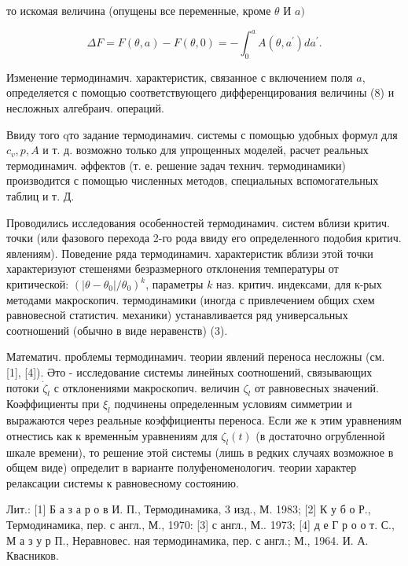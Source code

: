 \documentclass[10pt]{article}
\begin{document}
то искомая величина (опущены все переменные, кроме $\theta$ И $a)$



\[

\Delta F=F(\theta, a)-F(\theta, 0)=-\int_{0}^{a} A\left(\theta, a^{\prime}\right) d a^{\prime} .

\]



Изменение термодинамич. характеристик, связанное с включением поля $a$, определяется с помощью соответствующего дифференцирования величины (8) и несложных алгебраич. операций.



Ввиду того qто задание термодинамич. системы с помощью удобных формул для $c_{v}, p, A$ и т. д. возможно только для упрощенных моделей, расчет реальных термодинамич. әффектов (т. е. решение задач технич. термодинамики) производится с помощью численных методов, специальных вспомогательных таблиц и т. Д.



Проводились исследования особенностей термодинамич. систем вблизи критич. точки (или фазового перехода 2-го рода ввиду его определенного подобия критич. явлениям). Поведение ряда термодинамич. характеристик вблизи этой точки характеризуют стешенями безразмерного отклонения температуры от критической: $\left(\left|\theta-\theta_{0}\right| / \theta_{0}\right)^{k}$, параметры $k$ наз. критич. индексами, для к-рых методами макроскопич. термодинамики (иногда с привлечением общих схем равновесной статистич. механики) устанавливается ряд универсальных соотношений (обычно в виде неравенств) (3).



Математич. проблемы термодинамич. теории явлений переноса несложны (см. [1], [4]). Әто - исследование системы линейных соотношений, связывающих потоки $\dot{\zeta}_{l}$ с отклонениями макроскопич. величин $\zeta_{l}$ от равновесных значений. Коәффициенты при $\xi_{l}$ подчинены определенным условиям симметрии и выражаются через реальные коэффициенты переноса. Если же к этим уравнениям отнестись как к временны́м уравнениям для $\zeta_{l}(t)$ (в достаточно огрубленной шкале времени), то решение этой системы (лишь в редких случаях возможное в общем виде) определит в варианте полуфеноменологич. теории характер релаксации системы к равновесному состоянию.



Лит.: [1] Б а з а р о в И. П., Термодинамика, 3 изд., М. 1983; [2] К у б о Р., Термодинамика, пер. с англ., М., 1970: [3] с англ., М.. 1973; [4] д е Г р о о т. С., М а з у р П., Неравновес. ная термодинамика, пер. с англ.; М., 1964. И. А. Квасников.
\end{document}
